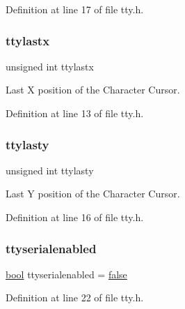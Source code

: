 Definition at line 17 of file tty.\+h.

\mbox{\label{a00035_afeb00c6ff15d0bf9455519131f45c651_afeb00c6ff15d0bf9455519131f45c651}} 
\subsubsection{\texorpdfstring{ttylastx}{ttylastx}}
{\footnotesize\ttfamily unsigned int ttylastx}



Last X position of the Character Cursor. 



Definition at line 13 of file tty.\+h.

\mbox{\label{a00035_adb472c81e607c23c4e70bdaed8153279_adb472c81e607c23c4e70bdaed8153279}} 
\subsubsection{\texorpdfstring{ttylasty}{ttylasty}}
{\footnotesize\ttfamily unsigned int ttylasty}



Last Y position of the Character Cursor. 



Definition at line 16 of file tty.\+h.

\mbox{\label{a00035_a828c82c174edbb885ba73ccbabf98333_a828c82c174edbb885ba73ccbabf98333}} 
\subsubsection{\texorpdfstring{ttyserialenabled}{ttyserialenabled}}
{\footnotesize\ttfamily \hyperlink{a00038_af6a258d8f3ee5206d682d799316314b1_af6a258d8f3ee5206d682d799316314b1}{bool} ttyserialenabled = \hyperlink{a00038_af6a258d8f3ee5206d682d799316314b1_af6a258d8f3ee5206d682d799316314b1ae9de385ef6fe9bf3360d1038396b884c}{false}}



Definition at line 22 of file tty.\+h.

